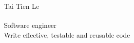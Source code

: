 {\Huge Tai Tien Le}
\\
\vspace{7pt}
\\
Software engineer\\
Write effective, testable and reusable code\\
